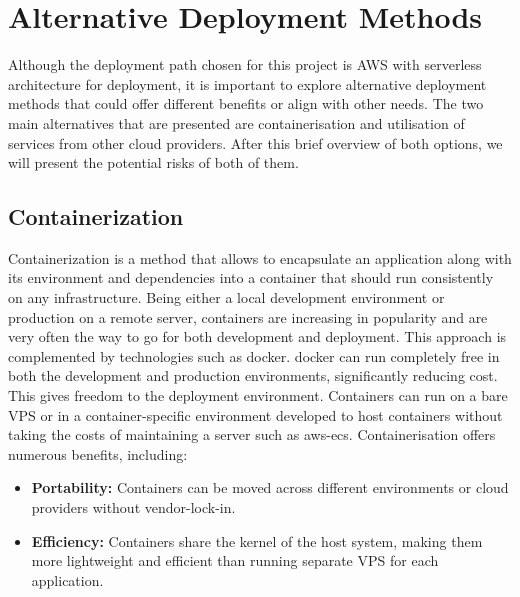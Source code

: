\section{Alternative Deployment Methods}
\label{sec:alternative-deployment-methods}

Although the deployment path chosen for this project is \ac{AWS} with serverless architecture for deployment, it is important to explore alternative deployment methods that could offer different benefits or align with other needs.
The two main alternatives that are presented are containerisation and utilisation of services from other cloud providers.
After this brief overview of both options, we will present the potential risks of both of them.
% 


\subsection{Containerization}
\label{subsec:containerization}
Containerization is a method that allows to encapsulate an application along with its environment and dependencies into a container that should run consistently on any infrastructure. 
Being either a local development environment or production on a remote server, containers are increasing in popularity and are very often the way to go for both development and deployment.
This approach is complemented by technologies such as \gls{docker}.
\gls{docker} can run completely free in both the development and production environments, significantly reducing cost.
This gives freedom to the deployment environment. 
Containers can run on a bare \ac{VPS} or in a container-specific environment developed to host containers without taking the costs of maintaining a server such as \gls{aws-ecs}.
 Containerisation offers numerous benefits, including:
 \begin{itemize}
     \item \textbf{Portability:} Containers can be moved across different environments or cloud providers without vendor-lock-in.
     \item \textbf{Efficiency:} Containers share the kernel of the host system, making them more lightweight and efficient than running separate \ac{VPS} for each application.
 \end{itemize}


